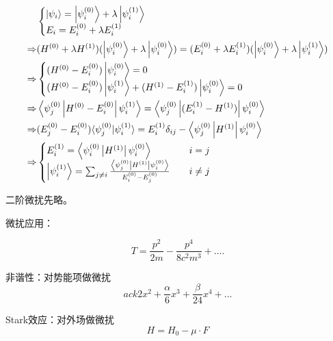 \documentclass[12pt,a4paper,openany,twoside]{book}
\numberwithin{equation}{section}
\newcommand{\bracket}[2]{\langle #1 | #2 \rangle}
\newcommand{\bracketl}[3]{\left\langle #1 \left| #2 \right| #3 \right\rangle}
\begin{document}
\begin{description}
            \begin{align*}
              &\begin{cases}
                \ket{\psi_i} = \ket{\psi_i^{(0)}}+\lambda \ket{\psi_i^{(1)}}\\
                E_i=E_i^{(0)} + \lambda E_i^{(1)}
              \end{cases}\\
              \Rightarrow & (H^{(0)}+\lambda H^{(1)})(\ket{\psi^{(0)}_i}+\lambda \ket{\psi_i^{(0)}})=(E_i^{(0)}+\lambda E^{(1)}_i)(\ket   {\psi_i^{(0)}}+\lambda \ket{\psi^{(1)}_i}) \\
              \Rightarrow & \begin{cases}
                (H^{(0)}-E_i^{(0)})\ket{\psi_i^{(0)}}=0\\
                (H^{(0)}-E_i^{(0)})\ket{\psi_i^{(1)}}+(H^{(1)}-E_i^{(1)})\ket{\psi_i^{(0)}} =0
              \end{cases}\\
              \Rightarrow & \bracketl{\psi_j^{(0)}}{H^{(0)}-E_i^{(0)}}{\psi_i^{(1)}}=\bracketl{\psi_j^{(0)}}{(E_i^{(1)}-H^{(1)})}{\psi_i^{  (0)}  }\\
              \Rightarrow & (E_j^{(0)}-E_i^{(0)})\bracket{\psi_j^{(0)}}{\psi_i^{(1)}}=E_i^{(1)}\delta_{ij} -\bracketl{\psi^{(0)}_j}{H^{(1)}}    {\psi_i^{(0)}}\\
              \Rightarrow &
              \begin{cases}
                E_i^{(1)}=\bracketl{\psi_i^{(0)}}{H^{(1)}}{\psi_i^{(0)}} &\quad i=j \\
                \ket{\psi_i^{(1)}}=\sum_{j\neq i}\frac{\bracketl{\psi^{(0)}_j}{H^{(1)}}{\psi^{(0)}_i}}{E^{(0)}_i-E^{(0)}_j} &\quad i\neq j
              \end{cases}
            \end{align*}

            二阶微扰先略。

            微扰应用：

            \begin{equation}
              T=\frac{p^2}{2m}-\frac{p^4}{8c^2m^3}+....
            \end{equation}
            \begin{description}
              \item 非谐性：对势能项做微扰
                \begin{equation}
                  ac{k}{2}x^2+\frac{\alpha}{6}x^3+\frac{\beta}{24}x^4+...
                \end{equation}
              \item Stark效应：对外场做微扰
                \begin{equation}
                  H=H_0-\mu\cdot F
                \end{equation}
            \end{description}
        \end{description}
\end{document}
